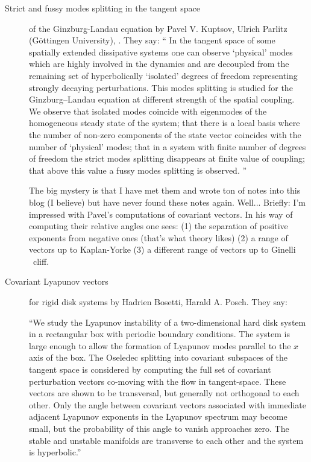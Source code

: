 \begin{description}
\item[Strict and fussy modes splitting in the tangent space]
of the Ginzburg-Landau equation
by Pavel V. Kuptsov, Ulrich Parlitz (G\"{o}ttingen University),
. They say:
``
In the tangent space of some spatially extended dissipative
systems one can observe `physical' modes which are highly
involved in the dynamics and are decoupled from the remaining set
of hyperbolically `isolated' degrees of freedom representing
strongly decaying perturbations. This modes splitting is studied
for the Ginzburg--Landau equation at different strength of the
spatial coupling. We observe that isolated modes coincide with
eigenmodes of the homogeneous steady state of the system; that
there is a local basis where the number of non-zero components of
the state vector coincides with the number of `physical' modes;
that in a system with finite number of degrees of freedom the
strict modes splitting disappears at finite value of coupling;
that above this value a fussy modes splitting is observed.
''

The big mystery is that I have met them and wrote ton of notes into
this blog (I believe) but have never found these notes again. Well...
Briefly: I'm impressed with Pavel's computations of covariant vectors.
In his way of computing their relative angles one sees: (1) the separation
of positive exponents from negative ones (that's what {\po} theory likes)
(2) a range of vectors up to Kaplan-Yorke (3) a different range of vectors
up to Ginelli \etal\ cliff.

\item[Covariant Lyapunov vectors] for rigid disk systems
by Hadrien Bosetti, Harald A. Posch. They say:

``We study
the Lyapunov instability of a two-dimensional hard disk
system in a rectangular box with periodic boundary
conditions. The system is large enough to allow the
formation of Lyapunov modes parallel to the $x$ axis of the
box. The Oseledec splitting into covariant subspaces of
the tangent space is considered by computing the full set
of covariant perturbation vectors co-moving with the flow
in tangent-space. These vectors are shown to be
transversal, but generally not orthogonal to each other.
Only the angle between covariant vectors associated with
immediate adjacent Lyapunov exponents in the Lyapunov
spectrum may become small, but the probability of this
angle to vanish approaches zero. The stable and unstable
manifolds are transverse to each other and the system is
hyperbolic.''


\end{description}
